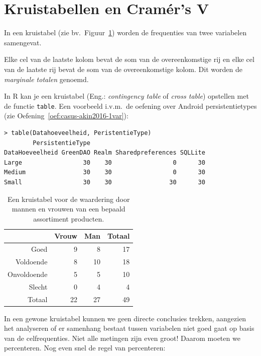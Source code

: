 \section{Kruistabellen en Cramér's V}

\begin{definition}[Kruistabel]
  In een kruistabel (zie bv.~Figuur~\ref{tab:kruistabel0}) worden de frequenties van twee variabelen samengevat.
  
  Elke cel van de laatste kolom bevat de som van de overeenkomstige rij en elke cel van de laatste rij bevat de som van de overeenkomstige kolom. Dit worden de \emph{marginale totalen} genoemd.
\end{definition}

In R kan je een kruistabel (Eng.: \emph{contingency table} of \emph{cross table}) opstellen met de functie \texttt{table}. Een voorbeeld i.v.m.~de oefening over Android persistentietypes (zie Oefening~\ref{oef:casus-akin2016-1var}):

\begin{lstlisting}
> table(Datahoeveelheid, PeristentieType)
        PersistentieType
DataHoeveelheid GreenDAO Realm Sharedpreferences SQLLite
Large                 30    30                 0      30
Medium                30    30                 0      30
Small                 30    30                30      30
\end{lstlisting}

\begin{table} \centering
  \begin{tabular}{@{}rrrr}
    \toprule
                & Vrouw & Man & Totaal \\ \midrule
           Goed &     9 &   8 &     17 \\
      Voldoende &     8 &  10 &     18 \\
    Onvoldoende &     5 &   5 &     10 \\
         Slecht &     0 &   4 &      4 \\
         Totaal &    22 &  27 &     49 \\ \bottomrule
  \end{tabular}
  \caption{Een kruistabel voor de waardering door mannen en vrouwen van een bepaald assortiment producten.}
  \label{tab:kruistabel0}
\end{table}

In een gewone kruistabel kunnen we geen directe conclusies trekken, aangezien het analyseren of er samenhang bestaat tussen variabelen niet goed gaat op basis van de celfrequenties. Niet alle metingen zijn even groot! Daarom moeten we percenteren. Nog even snel de regel van percenteren:

